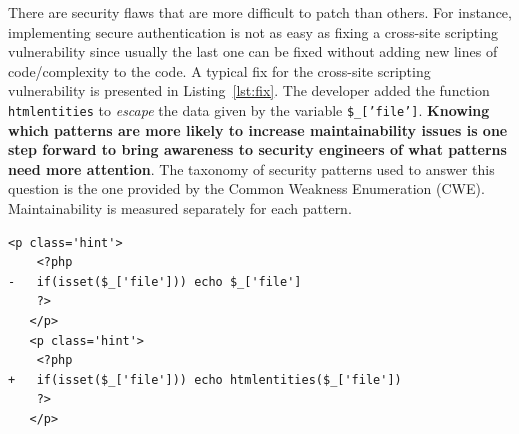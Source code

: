 \documentclass[sigconf,review]{acmart}
\newcounter{lstannotation}
\begin{document}
\vspace{-0.1cm}
% 
There are security flaws that are more difficult to patch than others. For
instance, implementing secure authentication is not as easy as fixing a
cross-site scripting vulnerability since usually the last one can be fixed
without adding new lines of code/complexity to the code. A typical fix for 
the cross-site scripting vulnerability is presented in Listing~\ref{lst:fix}. The developer added the function \texttt{htmlentities} to \textit{escape} the data given by the variable
\texttt{\$\_['file']}. \textbf{Knowing which patterns are more likely to increase
maintainability issues is one step forward to bring awareness to security
engineers of what patterns need more attention}. The taxonomy of security
patterns used to answer this question is the one provided by the Common Weakness Enumeration
(CWE). Maintainability is measured
separately for each pattern.
%
\setcounter{lstannotation}{0}
\begin{lstlisting}[style={PHPStyle}, caption={Fix provided by \texttt{nextcloud/server} developers to a \\Cross-Site Scripting vulnerability},label={lst:fix}]
   <p class='hint'>
    <?php
-   if(isset($_['file'])) echo $_['file']
    ?>
   </p>
   <p class='hint'>
    <?php
+   if(isset($_['file'])) echo htmlentities($_['file'])
    ?>
   </p>
\end{lstlisting}
%
\end{document}
